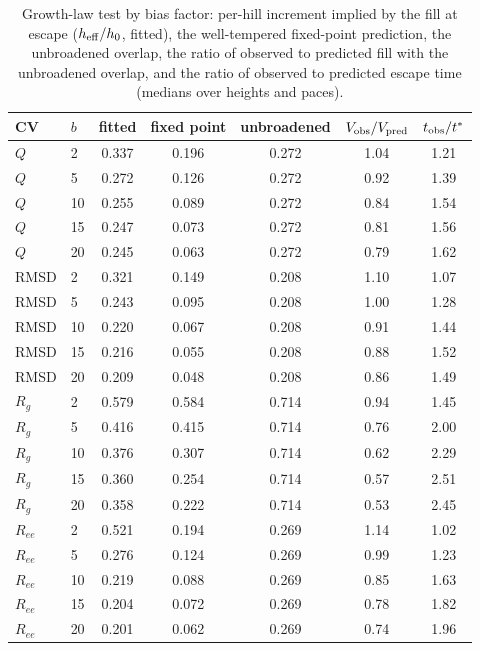 \begin{table}[H]\centering
\caption{Growth-law test by bias factor: per-hill increment implied by the fill at escape ($h_{\rm eff}/h_0$, fitted), the well-tempered fixed-point prediction, the unbroadened overlap, the ratio of observed to predicted fill with the unbroadened overlap, and the ratio of observed to predicted escape time (medians over heights and paces).}\label{tab:s7}
\begin{tabular}{llccccc}\toprule
CV & $b$ & fitted & fixed point & unbroadened & $V_{\rm obs}/V_{\rm pred}$ & $t_{\rm obs}/t^\ast$\\ \midrule
$Q$ & 2 & 0.337 & 0.196 & 0.272 & 1.04 & 1.21 \\
$Q$ & 5 & 0.272 & 0.126 & 0.272 & 0.92 & 1.39 \\
$Q$ & 10 & 0.255 & 0.089 & 0.272 & 0.84 & 1.54 \\
$Q$ & 15 & 0.247 & 0.073 & 0.272 & 0.81 & 1.56 \\
$Q$ & 20 & 0.245 & 0.063 & 0.272 & 0.79 & 1.62 \\
RMSD & 2 & 0.321 & 0.149 & 0.208 & 1.10 & 1.07 \\
RMSD & 5 & 0.243 & 0.095 & 0.208 & 1.00 & 1.28 \\
RMSD & 10 & 0.220 & 0.067 & 0.208 & 0.91 & 1.44 \\
RMSD & 15 & 0.216 & 0.055 & 0.208 & 0.88 & 1.52 \\
RMSD & 20 & 0.209 & 0.048 & 0.208 & 0.86 & 1.49 \\
$R_g$ & 2 & 0.579 & 0.584 & 0.714 & 0.94 & 1.45 \\
$R_g$ & 5 & 0.416 & 0.415 & 0.714 & 0.76 & 2.00 \\
$R_g$ & 10 & 0.376 & 0.307 & 0.714 & 0.62 & 2.29 \\
$R_g$ & 15 & 0.360 & 0.254 & 0.714 & 0.57 & 2.51 \\
$R_g$ & 20 & 0.358 & 0.222 & 0.714 & 0.53 & 2.45 \\
$R_{ee}$ & 2 & 0.521 & 0.194 & 0.269 & 1.14 & 1.02 \\
$R_{ee}$ & 5 & 0.276 & 0.124 & 0.269 & 0.99 & 1.23 \\
$R_{ee}$ & 10 & 0.219 & 0.088 & 0.269 & 0.85 & 1.63 \\
$R_{ee}$ & 15 & 0.204 & 0.072 & 0.269 & 0.78 & 1.82 \\
$R_{ee}$ & 20 & 0.201 & 0.062 & 0.269 & 0.74 & 1.96\\ \bottomrule
\end{tabular}
\end{table}
